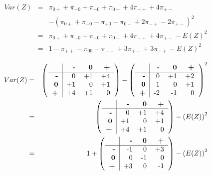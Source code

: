 \documentclass[12pt,a4paper,oneside]{book}
\begin{document}
\begin{eqnarray}
Var(Z) &=& \pi_{0+} + \pi_{-0} + \pi_{+0} + \pi_{0-} +4\pi_{-+} +4\pi_{+-} \nonumber \nonumber \\ 
&&	- (\pi_{0+} + \pi_{-0} - \pi_{+0} - \pi_{0-} +2\pi_{-+} -2\pi_{+-})^2 \nonumber \\
&=& \pi_{0+} + \pi_{-0} + \pi_{+0} + \pi_{0-} +4\pi_{-+} +4\pi_{+-} - E(Z)^2 \nonumber \\
&=& 1 - \pi_{++} - \pi_{00} - \pi_{--} + 3\pi_{+-} + 3\pi_{-+} - E(Z)^2
\end{eqnarray}

\begin{eqnarray*}
Var(Z) &=& 
\left(\begin{tabular}{r|r r r}
    			& \textbf{-} & \textbf{0} & \textbf{+} \\\hline
    \textbf{-} 	& 0		& +1	& +4	\\
    \textbf{0} 	& +1	& 0		& +1	\\
    \textbf{+} 	& +4	& +1	& 0		\\
\end{tabular} \right)
- \left(
\begin{tabular}{r|r r r}
    			& \textbf{-} & \textbf{0} & \textbf{+} \\\hline
    \textbf{-} 	& 0		& +1	& +2	\\
    \textbf{0} 	& -1	& 0		& +1	\\
    \textbf{+} 	& -2	& -1	& 0		\\
\end{tabular}
\right)^2  \\
&=& \left( \begin{tabular}{r|r r r}
    			& \textbf{-} & \textbf{0} & \textbf{+} \\\hline
    \textbf{-} 	& 0		& +1	& +4	\\
    \textbf{0} 	& +1	& 0		& +1	\\
    \textbf{+} 	& +4	& +1	& 0		\\
\end{tabular} \right)
- \left(E(Z)\right)^2 	\\
&=& 1 +  \left(\begin{tabular}{r|r r r}
    			& \textbf{-} & \textbf{0} & \textbf{+} \\\hline
    \textbf{-} 	& -1	& 0		& +3	\\
    \textbf{0} 	& 0		& -1	& 0	\\
    \textbf{+} 	& +3	& 0		& -1		\\
\end{tabular} \right)
 - \left(E(Z)\right)^2	\\
\end{eqnarray*}
\end{document}
